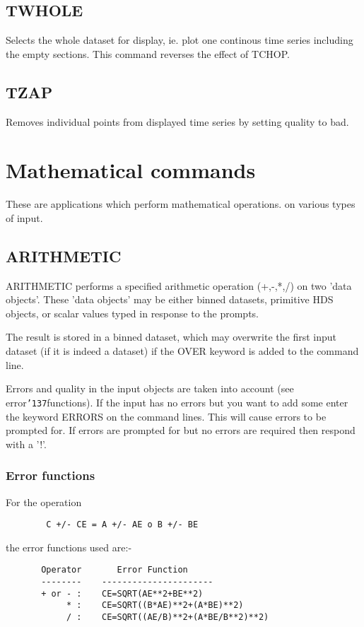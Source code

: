 \documentclass{book}
\renewcommand{\_}{{\tt\char'137}}     %
\begin{document}
\section{TWHOLE}
Selects the whole dataset for display, ie. plot one continous
time series including the empty sections. This command reverses
the effect of TCHOP.

\section{TZAP}
Removes individual points from displayed time series by setting
quality to bad.

\chapter{Mathematical commands}
These are applications which perform mathematical operations. on
various types of input.

\section{ARITHMETIC}
ARITHMETIC performs a specified arithmetic operation (+,-,*,/) on
two 'data objects'. These 'data objects' may be either binned
datasets, primitive HDS objects, or scalar values typed in
response to the prompts.

The result is stored in a binned dataset, which may overwrite
the first input dataset (if it is indeed a dataset) if the OVER
keyword is added to the command line.

Errors and quality in the input objects are taken into account
(see error\_functions). If the input has no errors but you want to
add some enter the keyword ERRORS on the command lines. This will
cause errors to be prompted for. If errors are prompted for but
no errors are required then respond with a '!'.

\subsection{Error functions}
For the operation
\begin{verbatim}
        C +/- CE = A +/- AE o B +/- BE
\end{verbatim}
the error functions used are:-
\begin{verbatim}
       Operator       Error Function
       --------    ----------------------
       + or - :    CE=SQRT(AE**2+BE**2)
            * :    CE=SQRT((B*AE)**2+(A*BE)**2)
            / :    CE=SQRT((AE/B)**2+(A*BE/B**2)**2)
\end{verbatim}
\end{document}

